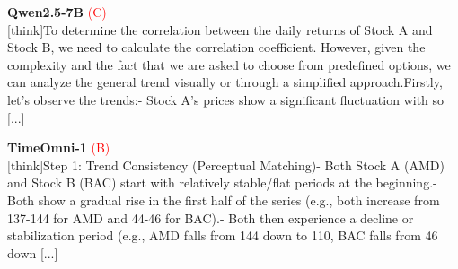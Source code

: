 \noindent
\begin{minipage}[t]{0.28\textwidth}
\colorbox{red!8}{\parbox{\dimexpr\textwidth-2\fboxsep}{
\textbf{Qwen2.5-7B} \textcolor{red}{(C)} \\[2pt]
\tiny
[think]To determine the correlation between the daily returns of Stock A and Stock B, we need to calculate the correlation coefficient. However, given the complexity and the fact that we are asked to choose from predefined options, we can analyze the general trend visually or through a simplified approach.\newline Firstly, let's observe the trends:\newline - Stock A's prices show a significant fluctuation with so [...]
}}
\end{minipage}
\hfill
\begin{minipage}[t]{0.28\textwidth}
\colorbox{red!8}{\parbox{\dimexpr\textwidth-2\fboxsep}{
\textbf{TimeOmni-1} \textcolor{red}{(B)} \\[2pt]
\tiny
[think]\newline Step 1: Trend Consistency (Perceptual Matching)\newline - Both Stock A (AMD) and Stock B (BAC) start with relatively stable/flat periods at the beginning.\newline - Both show a gradual rise in the first half of the series (e.g., both increase from  137-144 for AMD and  44-46 for BAC).\newline - Both then experience a decline or stabilization period (e.g., AMD falls from  144 down to  110, BAC falls from  46 down  [...]
}}
\end{minipage}
\hfill
